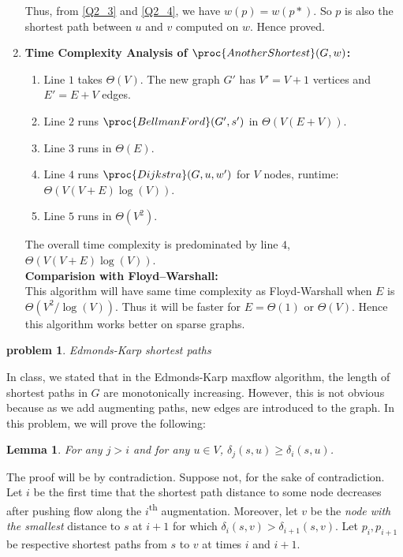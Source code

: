 \documentclass[11pt]{article}
\newtheorem{problem}{\sc\color{cit}problem}
\newtheorem{lemma}{Lemma}
\begin{document}
\begin{enumerate}
    Thus, from \eqref{Q2_3} and \eqref{Q2_4}, we have $w(p) = w(p*)$. So $p$ is also the shortest path between $u$ and $v$ computed on $w$. Hence proved.
    
    \item \textbf{Time Complexity Analysis of $\proc{AnotherShortest}(G,w)$:}
    \begin{enumerate}
        \item Line $1$ takes $\Theta(V)$. The new graph $G'$ has $V'=V+1$ vertices and $E'=E+V$ edges.
        \item Line $2$ runs $\proc{BellmanFord}(G',s')$ in $\Theta(V(E+V))$.
        \item Line $3$ runs in $\Theta(E)$.
        \item Line $4$ runs $\proc{Dijkstra}(G,u,w')$ for $V$ nodes, runtime: $\Theta(V(V+E)\log(V))$.
        \item Line $5$ runs in $\Theta(V^2)$.
    \end{enumerate}
    The overall time complexity is predominated by line $4$, $\Theta(V(V+E)\log(V))$.\\
    
    \textbf{Comparision with Floyd–Warshall:}\\
    This algorithm will have same time complexity as Floyd-Warshall when $E$ is $\Theta(V^2/\log(V))$. Thus it will be faster for $E = \Theta(1)$ or $\Theta(V)$. Hence this algorithm works better on sparse graphs.

\end{enumerate}


\newpage

\begin{problem} Edmonds-Karp shortest paths\end{problem}
In class, we stated that in the Edmonds-Karp maxflow algorithm, the length of
shortest paths in $G$ are monotonically increasing.  However, this is not obvious because as we add augmenting paths, new edges are introduced to the graph. In this problem, we will prove the following:

\begin{lemma}
For any $j>i$ and for any $u\in V$,  $\delta_j(s,u) \geq \delta_i(s,u)$.  
\end{lemma}
%

\noindent The proof will be by contradiction.
Suppose not, for the sake of contradiction.
Let $i$ be the first time that the shortest path distance to some node decreases after pushing flow along the $i$\textsuperscript{th} augmentation.
Moreover, let $v$ be the \emph{node with the smallest} distance to $s$ at $i+1$ for which  $\delta_i(s,v) > \delta_{i+1}(s,v)$. Let $p_i,p_{i+1}$ be respective shortest paths from $s$ to $v$ at times $i$ and $i+1$.
\end{document}
